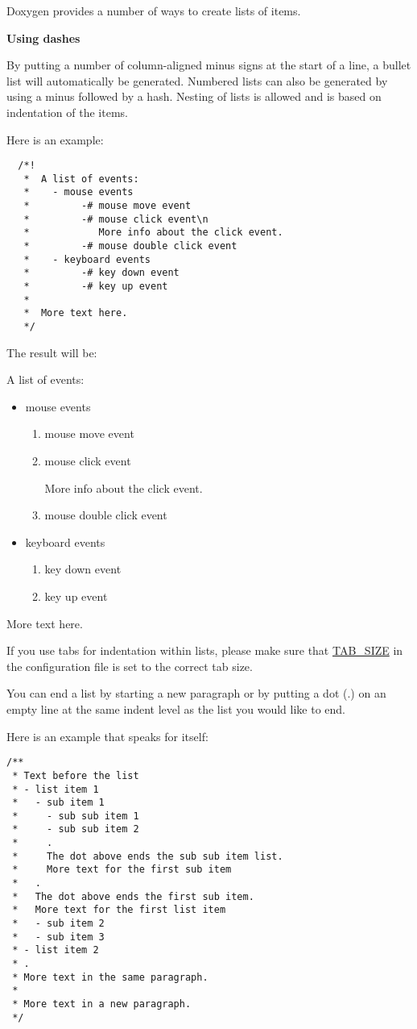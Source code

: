 Doxygen provides a number of ways to create lists of items.

{\bf Using dashes}

By putting a number of column-aligned minus signs at the start of a line, a bullet list will automatically be generated. Numbered lists can also be generated by using a minus followed by a hash. Nesting of lists is allowed and is based on indentation of the items.

Here is an example: 

\footnotesize\begin{verbatim}
  /*! 
   *  A list of events:
   *    - mouse events
   *         -# mouse move event
   *         -# mouse click event\n
   *            More info about the click event.
   *         -# mouse double click event
   *    - keyboard events
   *         -# key down event
   *         -# key up event
   *
   *  More text here.
   */
\end{verbatim}
\normalsize
 The result will be:

A list of events:\begin{itemize}
\item mouse events\begin{enumerate}
\item mouse move event\item mouse click event\par
 More info about the click event.\item mouse double click event\end{enumerate}
\item keyboard events\begin{enumerate}
\item key down event\item key up event\end{enumerate}
\end{itemize}


More text here.

If you use tabs for indentation within lists, please make sure that \hyperlink{config_cfg_tab_size}{TAB\_\-SIZE} in the configuration file is set to the correct tab size.

You can end a list by starting a new paragraph or by putting a dot (.) on an empty line at the same indent level as the list you would like to end.

Here is an example that speaks for itself:



\footnotesize\begin{verbatim}
/**
 * Text before the list
 * - list item 1
 *   - sub item 1
 *     - sub sub item 1
 *     - sub sub item 2
 *     . 
 *     The dot above ends the sub sub item list.
 *     More text for the first sub item
 *   .
 *   The dot above ends the first sub item.
 *   More text for the first list item
 *   - sub item 2
 *   - sub item 3
 * - list item 2
 * .
 * More text in the same paragraph.
 *
 * More text in a new paragraph.
 */
\end{verbatim}
\normalsize



